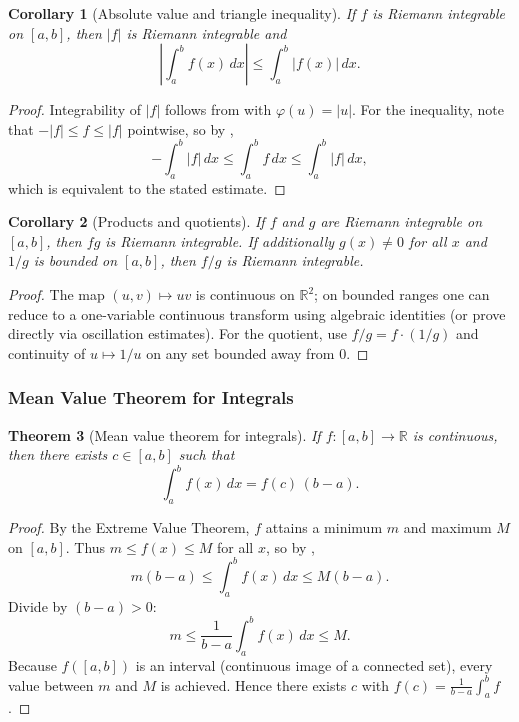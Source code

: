 \documentclass[12pt]{article}
\numberwithin{equation}{section}
\def\abs#1{|#1|}
\def\diff{d}
\newcommand{\RR}{\mathbb{R}}
\DeclarePairedDelimiter{\abs}{\lvert}{\rvert}
\newcommand{\diff}{\mathop{}\!\mathrm{d}}    %
\theoremstyle{plain}
\newtheorem{theorem}{Theorem}[section]
\newtheorem{corollary}[theorem]{Corollary}
\theoremstyle{definition}
\theoremstyle{remark}
\begin{document}
\begin{corollary}[Absolute value and triangle inequality]\label{cor:abs-int}
If $f$ is Riemann integrable on $[a,b]$, then $\abs{f}$ is Riemann integrable and
\[
\abs{\int_a^b f(x)\,\diff x}\le \int_a^b \abs{f(x)}\,\diff x.
\]
\end{corollary}

\begin{proof}
Integrability of $\abs{f}$ follows from  with $\varphi(u)=\abs{u}$.
For the inequality, note that $-\abs{f}\le f\le \abs{f}$ pointwise, so by ,
\[
-\int_a^b \abs{f}\,\diff x \le \int_a^b f\,\diff x \le \int_a^b \abs{f}\,\diff x,
\]
which is equivalent to the stated estimate.
\end{proof}

\begin{corollary}[Products and quotients]\label{cor:prod-quot}
If $f$ and $g$ are Riemann integrable on $[a,b]$, then $fg$ is Riemann integrable.
If additionally $g(x)\neq 0$ for all $x$ and $1/g$ is bounded on $[a,b]$, then $f/g$ is Riemann integrable.
\end{corollary}

\begin{proof}
The map $(u,v)\mapsto uv$ is continuous on $\RR^2$; on bounded ranges one can reduce to a one-variable continuous transform using algebraic identities (or prove directly via oscillation estimates).
For the quotient, use $f/g=f\cdot (1/g)$ and continuity of $u\mapsto 1/u$ on any set bounded away from $0$.
\end{proof}

\subsubsection{Mean Value Theorem for Integrals}

\begin{theorem}[Mean value theorem for integrals]\label{thm:mvt-integral}
If $f:[a,b]\to\RR$ is continuous, then there exists $c\in[a,b]$ such that
\[
\int_a^b f(x)\,\diff x = f(c)\,(b-a).
\]
\end{theorem}

\begin{proof}
By the Extreme Value Theorem, $f$ attains a minimum $m$ and maximum $M$ on $[a,b]$.
Thus $m\le f(x)\le M$ for all $x$, so by ,
\[
m(b-a)\le \int_a^b f(x)\,\diff x \le M(b-a).
\]
Divide by $(b-a)>0$:
\[
m \le \frac{1}{b-a}\int_a^b f(x)\,\diff x \le M.
\]
Because $f([a,b])$ is an interval (continuous image of a connected set), every value between $m$ and $M$ is achieved.
Hence there exists $c$ with $f(c)=\frac{1}{b-a}\int_a^b f$.
\end{proof}
\end{document}
